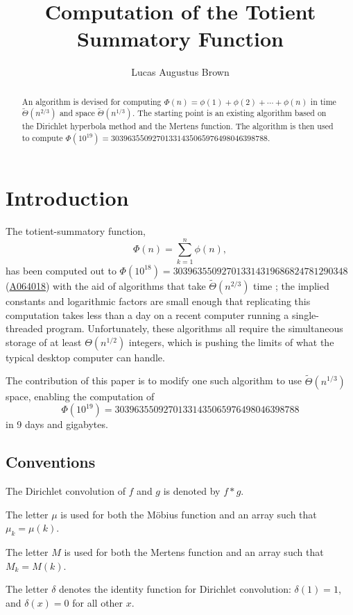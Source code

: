 \documentclass[12pt]{article}
\title{Computation of the Totient Summatory Function}
\author{Lucas Augustus Brown \orcidlink{0000-0002-6000-3735}}
\date{\currentdate}
\newcommand{\eqn}[1]{\begin{displaymath} #1 \end{displaymath}}
\newcommand{\seqnum}[1]{\href{https://oeis.org/#1}{#1}}
\newcommand{\softTheta}[0]{\widetilde{\Theta}}
\begin{document}
\maketitle %
\begin{abstract}
An algorithm is devised for computing $\Phi(n) = \phi(1) + \phi(2) + \cdots + \phi(n)$ in time $\softTheta(n^{2/3})$ and space $\softTheta(n^{1/3})$.  The starting point is an existing algorithm based on the Dirichlet hyperbola method and the Mertens function.  The algorithm is then used to compute $\Phi(10^{19}) = 30396355092701331435065976498046398788$.
\end{abstract}

\section{Introduction}

The totient-summatory function,
\eqn{\Phi(n) = \sum_{k=1}^n \phi(n),}
has been computed out to $\Phi(10^{18})=303963550927013314319686824781290348$ (\seqnum{A064018}) with the aid of algorithms that take $\softTheta(n^{2/3})$ time \cite{griff2023,adamant2023}; the implied constants and logarithmic factors are small enough that replicating this computation takes less than a day on a recent computer running a single-threaded program.  Unfortunately, these algorithms all require the simultaneous storage of at least $\Theta(n^{1/2})$ integers, which is pushing the limits of what the typical desktop computer can handle.

The contribution of this paper is to modify one such algorithm \cite[\texttt{totientSummatoryFast1}]{griff2023} to use $\softTheta(n^{1/3})$ space, enabling the computation of
\eqn{\Phi(10^{19}) = 30396355092701331435065976498046398788}
in 9 days and \todo gigabytes.

\subsection{Conventions}

The Dirichlet convolution of $f$ and $g$ is denoted by $f*g$.

The letter $\mu$ is used for both the M\"{o}bius function and an array such that $\mu_k = \mu(k)$.

The letter $M$ is used for both the Mertens function and an array such that $M_k = M(k)$.

The letter $\delta$ denotes the identity function for Dirichlet convolution: $\delta(1)=1$, and $\delta(x)=0$ for all other $x$.
\end{document}
